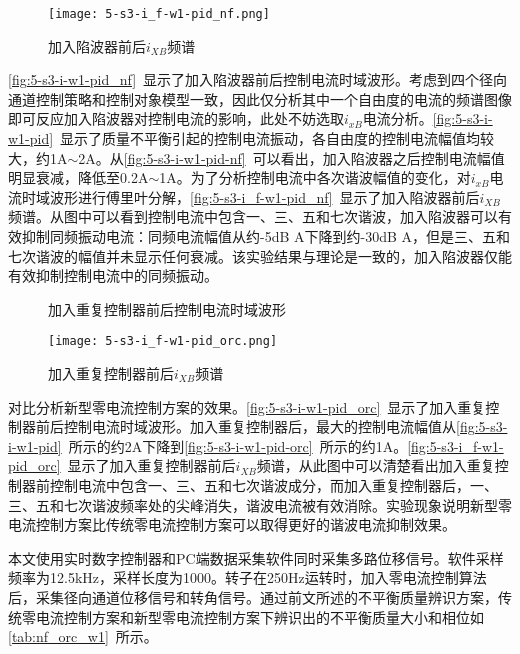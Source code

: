 \documentclass[
  lang=cn,
  degree=master,
  openany,oneside
]{nuaathesis}
\begin{document}
\begin{figure}[h!]
	\texttt{[image: 5-s3-i\_f-w1-pid\_nf.png]}
	\caption{加入陷波器前后$i_{XB}$频谱}
	\label{fig:5-s3-i_f-w1-pid_nf}
\end{figure}

\autoref{fig:5-s3-i-w1-pid_nf}~显示了加入陷波器前后控制电流时域波形。考虑到四个径向通道控制策略和控制对象模型一致，因此仅分析其中一个自由度的电流的频谱图像即可反应加入陷波器对控制电流的影响，此处不妨选取$i_{xB}$电流分析。\autoref{fig:5-s3-i-w1-pid}~显示了质量不平衡引起的控制电流振动，各自由度的控制电流幅值均较大，约1A$\sim$2A。从\autoref{fig:5-s3-i-w1-pid-nf}~可以看出，加入陷波器之后控制电流幅值明显衰减，降低至0.2A$\sim$1A。为了分析控制电流中各次谐波幅值的变化，对$i_{xB}$电流时域波形进行傅里叶分解，\autoref{fig:5-s3-i_f-w1-pid_nf}~显示了加入陷波器前后$i_{XB}$频谱。从图中可以看到控制电流中包含一、三、五和七次谐波，加入陷波器可以有效抑制同频振动电流：同频电流幅值从约-5dB A下降到约-30dB A，但是三、五和七次谐波的幅值并未显示任何衰减。该实验结果与理论是一致的，加入陷波器仅能有效抑制控制电流中的同频振动。

\begin{figure}[h!]  
	\quad  
	\caption{加入重复控制器前后控制电流时域波形}  \label{fig:5-s3-i-w1-pid_orc}
\end{figure}

\begin{figure}[h!]
	\texttt{[image: 5-s3-i\_f-w1-pid\_orc.png]}
	\caption{加入重复控制器前后$i_{XB}$频谱}
	\label{fig:5-s3-i_f-w1-pid_orc}
\end{figure}

对比分析新型零电流控制方案的效果。\autoref{fig:5-s3-i-w1-pid_orc}~显示了加入重复控制器前后控制电流时域波形。加入重复控制器后，最大的控制电流幅值从\autoref{fig:5-s3-i-w1-pid}~所示的约2A下降到\autoref{fig:5-s3-i-w1-pid-orc}~所示的约1A。\autoref{fig:5-s3-i_f-w1-pid_orc}~显示了加入重复控制器前后$i_{XB}$频谱，从此图中可以清楚看出加入重复控制器前控制电流中包含一、三、五和七次谐波成分，而加入重复控制器后，一、三、五和七次谐波频率处的尖峰消失，谐波电流被有效消除。实验现象说明新型零电流控制方案比传统零电流控制方案可以取得更好的谐波电流抑制效果。

本文使用实时数字控制器和PC端数据采集软件同时采集多路位移信号。软件采样频率为12.5kHz，采样长度为1000。转子在250Hz运转时，加入零电流控制算法后，采集径向通道位移信号和转角信号。通过前文所述的不平衡质量辨识方案，传统零电流控制方案和新型零电流控制方案下辨识出的不平衡质量大小和相位如\autoref{tab:nf_orc_w1}~所示。
\end{document}

